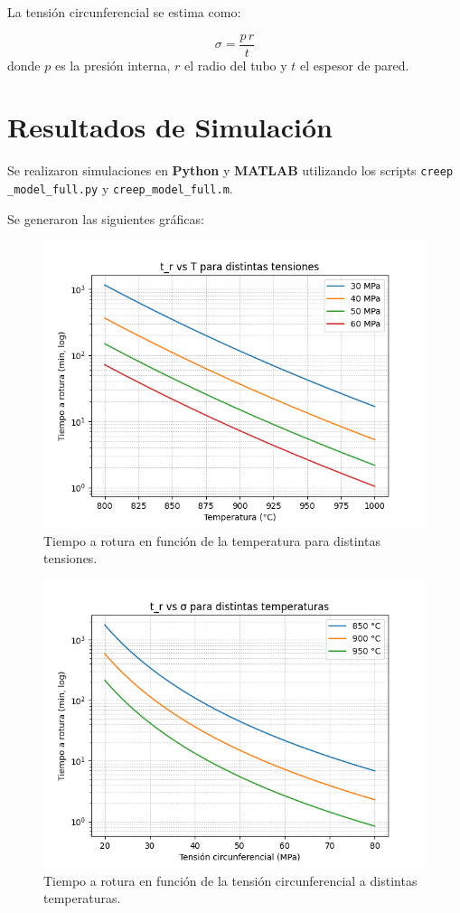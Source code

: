 \documentclass[12pt,a4paper]{article}
\begin{document}
La tensión circunferencial se estima como:

\begin{equation}
    \sigma = \frac{p \, r}{t}
\end{equation}
donde $p$ es la presión interna, $r$ el radio del tubo y $t$ el espesor de pared.

\section{Resultados de Simulación}
Se realizaron simulaciones en \textbf{Python} y \textbf{MATLAB} utilizando los scripts \texttt{creep \_model\_full.py} y \texttt{creep\_model\_full.m}.

Se generaron las siguientes gráficas:

\begin{figure}[H]
    \centering
    \includegraphics[width=0.7\linewidth]{tr_vs_T.png}
    \caption{Tiempo a rotura en función de la temperatura para distintas tensiones.}
\end{figure}

\begin{figure}[H]
    \centering
    \includegraphics[width=0.7\linewidth]{tr_vs_sigma.png}
    \caption{Tiempo a rotura en función de la tensión circunferencial a distintas temperaturas.}
\end{figure}
\end{document}
